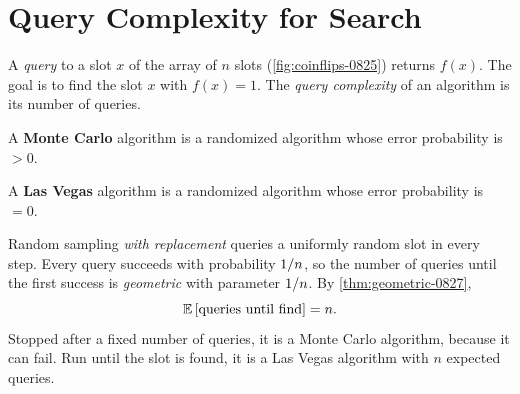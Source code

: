 
\section{Query Complexity for Search}

A \emph{query} to a slot $x$ of the array of $n$ slots (\cref{fig:coinflips-0825}) returns $f(x)$.
The goal is to find the slot $x$ with $f(x) = 1$. The \emph{query complexity} of an algorithm is
its number of queries.

\begin{definition}\label{def:mclv-0901}
    A \textbf{Monte Carlo} algorithm is a randomized algorithm whose error probability is $> 0$.

    A \textbf{Las Vegas} algorithm is a randomized algorithm whose error probability is $= 0$.
\end{definition}

Random sampling \emph{with replacement} queries a uniformly random slot in every step. Every query
succeeds with probability $1/n$, so the number of queries until the first success is
\emph{geometric} with parameter $1/n$. By \cref{thm:geometric-0827},
\[\expectation{\text{queries until find}} = n.\]
Stopped after a fixed number of queries, it is a Monte Carlo algorithm, because it can fail. Run
until the slot is found, it is a Las Vegas algorithm with $n$ expected queries.

